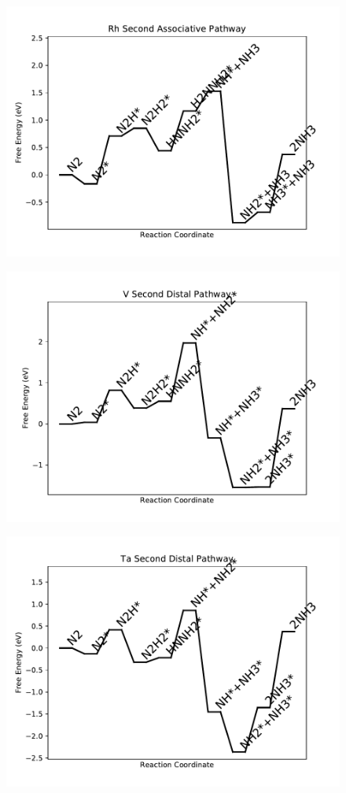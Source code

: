\begin{figure}
\centering
\includegraphics[width=0.8\linewidth]{data/plots/Rh_associative_2.pdf}
\end{figure}

\begin{figure}
\centering
\includegraphics[width=0.8\linewidth]{data/plots/V_distal_2.pdf}
\end{figure}

\begin{figure}
\centering
\includegraphics[width=0.8\linewidth]{data/plots/Ta_distal_2.pdf}
\end{figure}

